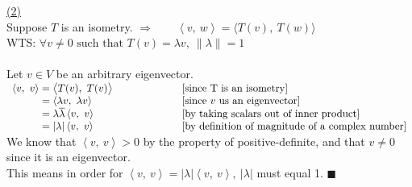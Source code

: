 \documentclass[12pt]{article}
\newcommand{\innerproduct}[2]{\left\langle #1, \ #2\right\rangle}
\newcommand{\bigInnerproduct}[2]{\big\langle #1, \ #2\big\rangle}
\renewcommand{\qed}{\hfill$\blacksquare$}
\begin{document}
\hyperlink{toc}{\hypertarget{2.2}{(2)}}\\
Suppose $T$ is an isometry. \qquad $\Longrightarrow \qquad \innerproduct{v}{w} = \bigInnerproduct{T(v)}{T(w)}$\\
WTS: $\forall v \not = 0 \text{ such that } T(v) = \lambda v,\  \|\lambda \| = 1 $
\\\\
Let $v \in V$ be an arbitrary eigenvector.\\
{$\begin{array}{r@{}>{\displaystyle}ll}
	\innerproduct{v}{v} & {}= \bigInnerproduct{T(v)}{T(v)} \hspace*{20mm} & [\text{since T is an isometry}] \\
						& {}= \innerproduct{\lambda v}{\lambda v} & [\text{since $v$ us an eigenvector}]   \\
						& {}= \lambda \overline{\lambda}\innerproduct{ v}{ v} & [\text{by taking scalars out of inner product}]   \\
						& {}= |\lambda| \innerproduct{ v}{ v} & [\text{by definition of magnitude of a complex number}]   \\
\end{array}$}\\[5mm]
We know that $\innerproduct{v}{v} > 0$ by the property of positive-definite, and that $v \not = 0$ since it is an eigenvector.\\
This means in order for $\innerproduct{v}{v} = | \lambda|\innerproduct{v}{v},\ | \lambda|$ must equal 1. \qed \newpage
\end{document}
